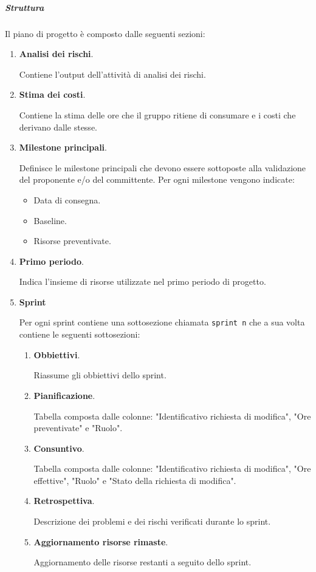 \subparagraph{Struttura}
Il piano di progetto è composto dalle seguenti sezioni:
\begin{enumerate}
    \item \textbf{Analisi dei rischi}.
    
    Contiene l'output dell'attività di analisi dei rischi.

    \item \textbf{Stima dei costi}.
    
    Contiene la stima delle ore che il gruppo ritiene di consumare e i costi che derivano dalle stesse. 
    
    \item \textbf{Milestone principali}.
    
    Definisce le milestone principali che devono essere sottoposte alla validazione del proponente e/o del committente.
    Per ogni milestone vengono indicate:
    \begin{itemize}
        \item Data di consegna.
        \item Baseline.
        \item Risorse preventivate.
    \end{itemize}
    
    \item \textbf{Primo periodo}.
    
    Indica l'insieme di risorse utilizzate nel primo periodo di progetto.
    
    \item \textbf{Sprint}
    
    Per ogni sprint contiene una sottosezione chiamata \texttt{sprint n} che a sua volta contiene le seguenti sottosezioni:
    \begin{enumerate}
        \item \textbf{Obbiettivi}.
        
        Riassume gli obbiettivi dello sprint.

        \item \textbf{Pianificazione}.
        
        Tabella composta dalle colonne: "Identificativo richiesta di modifica", "Ore preventivate" e "Ruolo".

        \item \textbf{Consuntivo}.
        
        Tabella composta dalle colonne: "Identificativo richiesta di modifica", "Ore effettive", "Ruolo" e "Stato della richiesta di modifica".
        
        \item \textbf{Retrospettiva}.
        
        Descrizione dei problemi e dei rischi verificati durante lo sprint.

        \item \textbf{Aggiornamento risorse rimaste}.
        
        Aggiornamento delle risorse restanti a seguito dello sprint.
    \end{enumerate}

\end{enumerate}